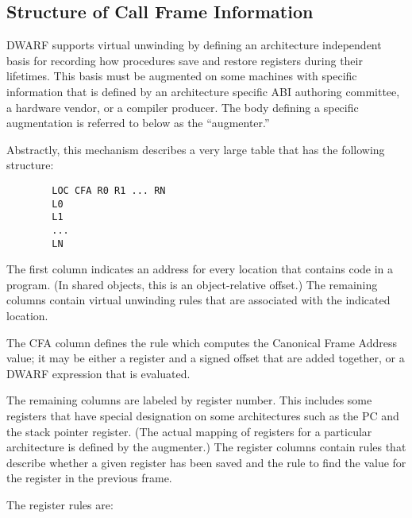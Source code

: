 \subsection{Structure of Call Frame Information}
\label{chap:structureofcallframeinformation}

DWARF supports virtual unwinding by defining an architecture
independent basis for recording how procedures save and restore
registers during their lifetimes. This basis must be augmented
on some machines with specific information that is defined by
an architecture specific ABI authoring committee, a hardware
vendor, or a compiler producer. The body defining a specific
augmentation is referred to below as the ``augmenter.''

Abstractly, this mechanism describes a very large table that
has the following structure:

\begin{verbatim}
        LOC CFA R0 R1 ... RN
        L0
        L1
        ...
        LN
\end{verbatim}


The first column indicates an address for every location
that contains code in a program. (In shared objects, this
is an object-relative offset.) The remaining columns contain
virtual unwinding rules that are associated with the indicated
location.

The CFA column defines the rule which computes the Canonical
Frame Address value; it may be either a register and a signed
offset that are added together, or a DWARF expression that
is evaluated.

The remaining columns are labeled by register number. This
includes some registers that have special designation on
some architectures such as the PC and the stack pointer
register. (The actual mapping of registers for a particular
architecture is defined by the augmenter.) The register columns
contain rules that describe whether a given register has been
saved and the rule to find the value for the register in the
previous frame.

The register rules are:


